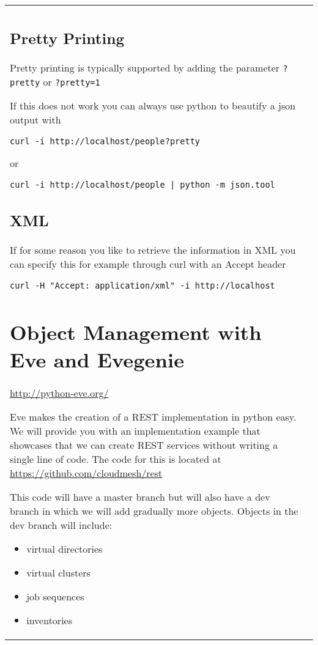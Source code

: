 \begin{tabular}{ll}
\begin{comment}
This is the practical representation of the HATEOAS in real world
applications.
\end{comment}

\subsection{Pretty Printing}

Pretty printing is typically supported by adding the parameter
\verb|?pretty| or \verb|?pretty=1|

If this does not work you can always use python to beautify a json
output with 

\begin{lstlisting}
curl -i http://localhost/people?pretty
\end{lstlisting}

or

\begin{lstlisting}
curl -i http://localhost/people | python -m json.tool
\end{lstlisting}

\subsection{XML}

If for some reason you like to retrieve the information in XML you can
specify this for example through curl with an Accept header

\begin{lstlisting}
curl -H "Accept: application/xml" -i http://localhost
\end{lstlisting}


\section{Object Management with Eve and Evegenie}

\url{http://python-eve.org/}

Eve makes the creation of a REST implementation in python easy.  We
will provide you with an implementation example that showcases that we
can create REST services without writing a single line of code. The
code for this is located at \url{https://github.com/cloudmesh/rest}

This code will have a master branch but will also have a dev branch in
which we will add gradually more objects. Objects in the dev branch will
include:

\begin{itemize}
\item
 virtual directories
\item
 virtual clusters
\item
 job sequences
\item
 inventories
\end{itemize}


\end{tabular}
